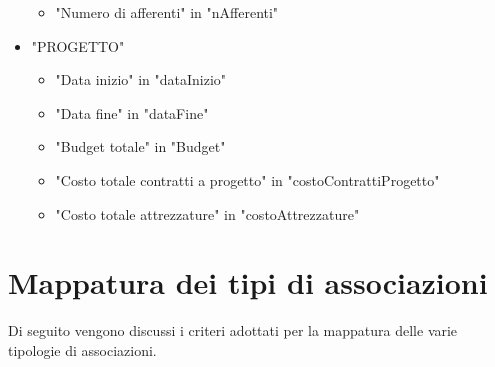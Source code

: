 \begin{itemize}
                \begin{itemize}
                    \item "Numero di afferenti" in "nAfferenti"
                \end{itemize}
            \item "PROGETTO"
                \begin{itemize}
                    \item "Data inizio" in "dataInizio"
                    \item "Data fine" in "dataFine"
                    \item "Budget totale" in "Budget"
                    \item "Costo totale contratti a progetto" in "costoContrattiProgetto"
                    \item "Costo totale attrezzature" in "costoAttrezzature"
                \end{itemize}
        \end{itemize}

    \section{Mappatura dei tipi di associazioni}
    Di seguito vengono discussi i criteri adottati per la mappatura delle varie tipologie di associazioni.

